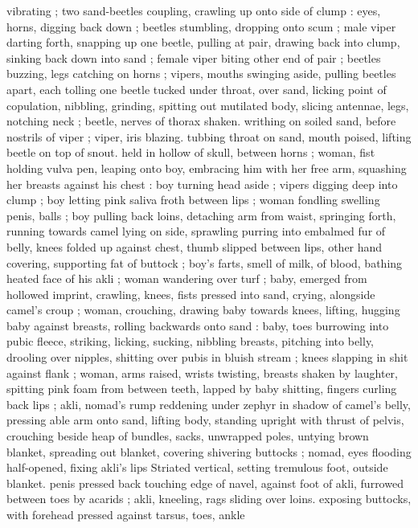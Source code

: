 vibrating ; two sand-beetles coupling, crawling up onto side of clump 
: eyes, horns, digging back down ; beetles stumbling, dropping onto 
scum ; male viper darting forth, snapping up one beetle, pulling at 
pair, drawing back into clump, sinking back down into sand ; female 
viper biting other end of pair ; beetles buzzing, legs catching on 
horns ; vipers, mouths swinging aside, pulling beetles apart, each 
tolling one beetle tucked under throat, over sand, licking point of 
copulation, nibbling, grinding, spitting out mutilated body, slicing 
antennae, legs, notching neck ; beetle, nerves of thorax shaken. 
writhing on soiled sand, before nostrils of viper ; viper, iris blazing. 
tubbing throat on sand, mouth poised, lifting beetle on top of snout. 
held in hollow of skull, between horns ; woman, fist holding vulva 
pen, leaping onto boy, embracing him with her free arm, squashing 
her breasts against his chest : boy turning head aside ; vipers 
digging deep into clump ; boy letting pink saliva froth between lips ; 
woman fondling swelling penis, balls ; boy pulling back loins, 
detaching arm from waist, springing forth, running towards camel 
lying on side, sprawling purring into embalmed fur of belly, knees 
folded up against chest, thumb slipped between lips, other hand 
covering, supporting fat of buttock ; boy's farts, smell of milk, of 
blood, bathing heated face of his akli ; woman wandering over turf ; 
baby, emerged from hollowed imprint, crawling, knees, fists pressed 
into sand, crying, alongside camel's croup ; woman, crouching, 
drawing baby towards knees, lifting, hugging baby against breasts, 
rolling backwards onto sand : baby, toes burrowing into pubic fleece, 
striking, licking, sucking, nibbling breasts, pitching into belly, 
drooling over nipples, shitting over pubis in bluish stream ; knees 
slapping in shit against flank ; woman, arms raised, wrists twisting, 
breasts shaken by laughter, spitting pink foam from between teeth, 
lapped by baby shitting, fingers curling back lips ; akli, nomad's 
rump reddening under zephyr in shadow of camel's belly, pressing 
able arm onto sand, lifting body, standing upright with thrust of 
pelvis, crouching beside heap of bundles, sacks, unwrapped poles, 
untying brown blanket, spreading out blanket, covering shivering 
buttocks ; nomad, eyes flooding half-opened, fixing akli's lips 
Striated vertical, setting tremulous foot, outside blanket. penis 
pressed back touching edge of navel, against foot of akli, furrowed 
between toes by acarids ; akli, kneeling, rags sliding over loins. 
exposing buttocks, with forehead pressed against tarsus, toes, ankle 
